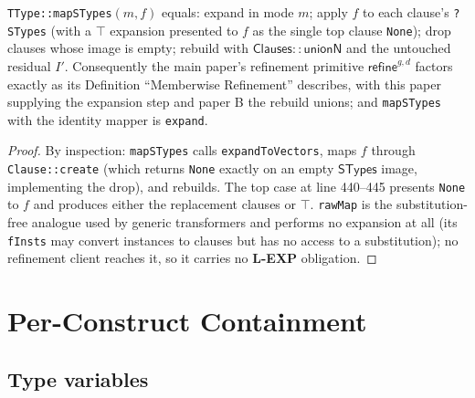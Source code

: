 \documentclass[11pt]{article}
\newcommand{\STypes}{\mathsf{STypes}}
\newcommand{\Clauses}{\mathsf{Clauses}}
\newcommand{\refop}{\mathsf{refine}}
\begin{document}
\begin{lemma}
\label{lem:mapstypes}
\texttt{TType::mapSTypes}$(m, f)$ equals: expand in mode $m$; apply $f$
to each clause's \texttt{?STypes} (with a $\top$ expansion presented to
$f$ as the single top clause \texttt{None}); drop clauses whose image is
empty; rebuild with $\Clauses{::}\mathsf{unionN}$ and the untouched
residual $I'$. Consequently the main paper's refinement primitive
$\refop^{g,d}$ factors exactly as its Definition ``Memberwise
Refinement'' describes, with this paper supplying the expansion step and
paper B the rebuild unions; and \texttt{mapSTypes} with the identity
mapper is \texttt{expand}.
\end{lemma}
\begin{proof}
By inspection: \texttt{mapSTypes} calls \texttt{expandToVectors}, maps
$f$ through \texttt{Clause::create} (which returns \texttt{None} exactly
on an empty $\STypes$ image, implementing the drop), and rebuilds. The
top case at line 440--445 presents \texttt{None} to $f$ and produces
either the replacement clauses or $\top$. \texttt{rawMap} is the
substitution-free analogue used by generic transformers and performs no
expansion at all (its \texttt{fInsts} may convert instances to clauses
but has no access to a substitution); no refinement client reaches it,
so it carries no \textbf{L-EXP} obligation.
\end{proof}

\section{Per-Construct Containment}
\label{sec:constructs}

\subsection{Type variables}
\label{sec:tvar}
\end{document}
